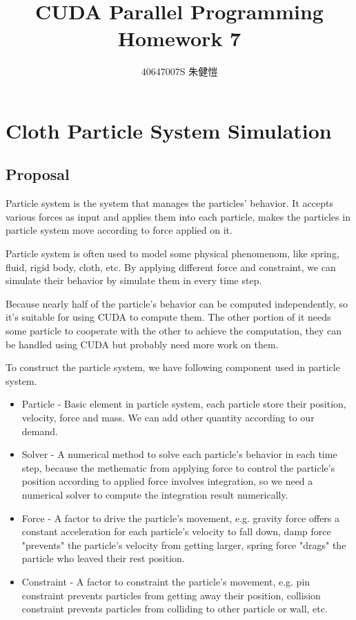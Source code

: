 \documentclass{article}
\title{CUDA Parallel Programming\\Homework 7}
\author{40647007S 朱健愷}
\begin{document}
	\maketitle
	\section{Cloth Particle System Simulation}
	\subsection{Proposal}
	Particle system is the system that manages the particles' behavior. It accepts various forces as input and applies them into each particle, makes the particles in particle system move according to force applied on it.
	
	Particle system is often used to model some physical phenomenom, like spring, fluid, rigid body, cloth, etc. By applying different force and constraint, we can simulate their behavior by simulate them in every time step.
	
	Because nearly half of the particle's behavior can be computed independently, so it's suitable for using CUDA to compute them. The other portion of it needs some particle to cooperate with the other to achieve the computation, they can be handled using CUDA but probably need more work on them.
	
	To construct the particle system, we have following component used in particle system.
	\begin{itemize}
		\item Particle - Basic element in particle system, each particle store their position, velocity, force and mass. We can add other quantity according to our demand.
		\item Solver - A numerical method to solve each particle's behavior in each time step, because the methematic from applying force to control the particle's position according to applied force involves integration, so we need a numerical solver to compute the integration result numerically.
		\item Force - A factor to drive the particle's movement, e.g. gravity force offers a constant acceleration for each particle's velocity to fall down, damp force "prevents" the particle's velocity from getting larger, spring force "drags" the particle who leaved their rest position.
		\item Constraint - A factor to constraint the particle's movement, e.g. pin constraint prevents particles from getting away their position, collision constraint prevents particles from colliding to other particle or wall, etc.
	\end{itemize}
\end{document}
